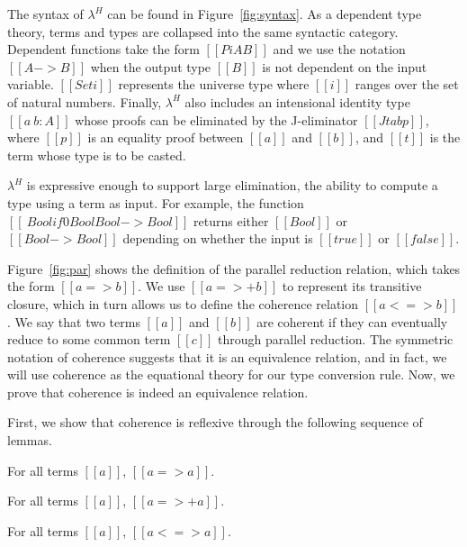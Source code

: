 \documentclass[nonacm]{acmart}
\newcommand{\lang}{$\lambda^H$\xspace}
\begin{document}
The syntax of \lang can be found in Figure~\ref{fig:syntax}. As a
dependent type theory, terms and types are collapsed into the same
syntactic category. Dependent functions take the form $[[Pi A B]]$ and
we use the notation $[[A -> B]]$ when the output type $[[B]]$ is not
dependent on the input variable. $[[Set i]]$ represents the universe
type where $[[i]]$ ranges over the set of natural numbers. Finally,
\lang also includes an intensional identity type $[[a ~ b : A]]$ whose
proofs can be eliminated by the J-eliminator $[[J t a b p]]$, where
$[[p]]$ is an equality proof between $[[a]]$ and $[[b]]$, and $[[t]]$
is the term whose type is to be casted.

\lang is expressive enough to support large
elimination, the ability to compute a type using a term as input. For
example, the function $[[\ Bool if 0 Bool Bool -> Bool]]$ returns
either $[[Bool]]$ or $[[Bool -> Bool]]$ depending on whether the input
is $[[true]]$ or $[[false]]$.

Figure~\ref{fig:par} shows the definition of the parallel reduction
relation, which takes the form $[[a => b]]$. We use $[[a =>+ b]]$ to
represent its transitive closure, which in turn allows us to define
the coherence relation $[[a <=> b]]$. %
We say that two terms $[[a]]$
and $[[b]]$ are coherent if they can eventually reduce to some common
term $[[c]]$ through parallel reduction. The symmetric notation of
coherence suggests that it is an equivalence relation, and in fact, we
will use coherence as the equational theory for our type conversion
rule. Now, we prove that coherence is indeed an equivalence relation.

First, we show that coherence is reflexive through the following
sequence of lemmas.
\begin{lemma}
  \label{lemma:parrefl}
  For all terms $[[a]]$, $[[a => a]]$.
\end{lemma}

\begin{lemma}
  \label{lemma:parsrefl}
  For all terms $[[a]]$, $[[a =>+ a]]$.
\end{lemma}

\begin{lemma}
  \label{lemma:coherencerefl}
  For all terms $[[a]]$, $[[a <=> a]]$.
\end{lemma}
\end{document}
